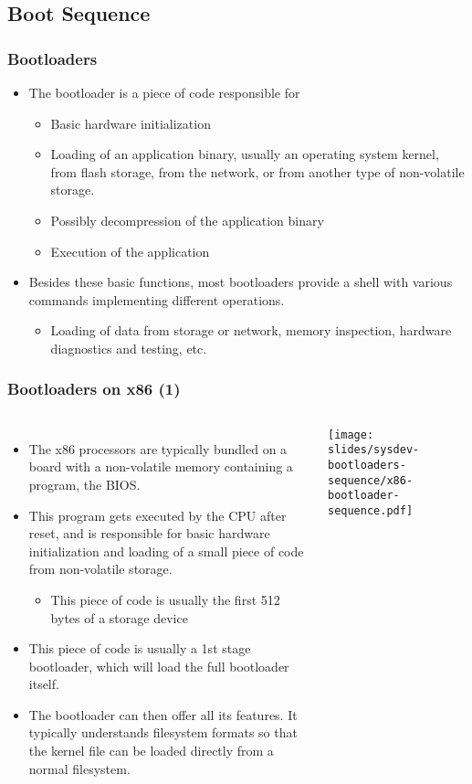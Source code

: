 \subsection{Boot Sequence}
\begin{frame}
  \frametitle{Bootloaders}
  \begin{itemize}
  \item The bootloader is a piece of code responsible for
    \begin{itemize}
    \item Basic hardware initialization
    \item Loading of an application binary, usually an operating
      system kernel, from flash storage, from the network, or from
      another type of non-volatile storage.
    \item Possibly decompression of the application binary
    \item Execution of the application
    \end{itemize}
  \item Besides these basic functions, most bootloaders provide a
    shell with various commands implementing different operations.
    \begin{itemize}
    \item Loading of data from storage or network, memory inspection,
      hardware diagnostics and testing, etc.
    \end{itemize}
  \end{itemize}
\end{frame}

\begin{frame}
  \frametitle{Bootloaders on x86 (1)}
  \begin{columns}
    \begin{itemize}
    \item The x86 processors are typically bundled on a board with a
      non-volatile memory containing a program, the BIOS.
    \item This program gets executed by the CPU after reset, and is
      responsible for basic hardware initialization and loading of a
      small piece of code from non-volatile storage.
      \begin{itemize}
      \item This piece of code is usually the first 512 bytes of a
        storage device
      \end{itemize}
    \item This piece of code is usually a 1st stage bootloader, which
      will load the full bootloader itself.
    \item The bootloader can then offer all its features. It typically
      understands filesystem formats so that the kernel file can be
      loaded directly from a normal filesystem.
    \end{itemize}
    \texttt{[image: slides/sysdev-bootloaders-sequence/x86-bootloader-sequence.pdf]}
  \end{columns}
\end{frame}

